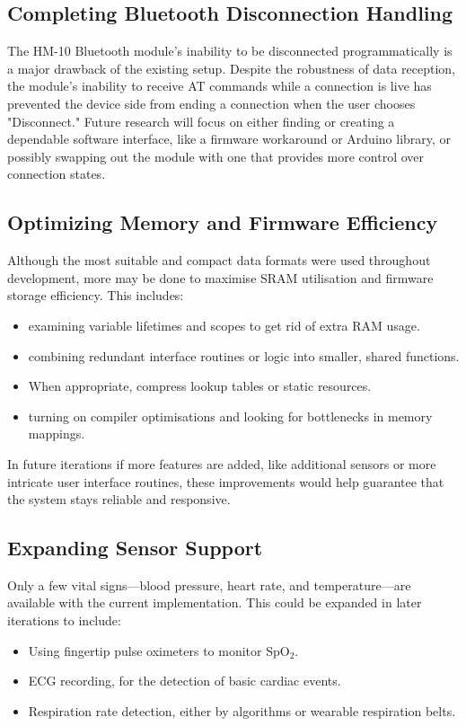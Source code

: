 \subsection{Completing Bluetooth Disconnection Handling}
The HM-10 Bluetooth module's inability to be disconnected programmatically is a major drawback of the existing setup. Despite the robustness of data reception, the module's inability to receive AT commands while a connection is live has prevented the device side from ending a connection when the user chooses "Disconnect." Future research will focus on either finding or creating a dependable software interface, like a firmware workaround or Arduino library, or possibly swapping out the module with one that provides more control over connection states.

\subsection{Optimizing Memory and Firmware Efficiency}
Although the most suitable and compact data formats were used throughout development, more may be done to maximise SRAM utilisation and firmware storage efficiency. This includes:

\begin{itemize}
	\item examining variable lifetimes and scopes to get rid of extra RAM usage.
	\item combining redundant interface routines or logic into smaller, shared functions.
	\item When appropriate, compress lookup tables or static resources.
	\item turning on compiler optimisations and looking for bottlenecks in memory mappings.
\end{itemize}

In future iterations if more features are added, like additional sensors or more intricate user interface routines, these improvements would help guarantee that the system stays reliable and responsive.

\subsection{Expanding Sensor Support}
Only a few vital signs---blood pressure, heart rate, and temperature---are available with the current implementation. This could be expanded in later iterations to include:

\begin{itemize}
	\item Using fingertip pulse oximeters to monitor SpO$_2$.
	\item ECG recording, for the detection of basic cardiac events.
	\item Respiration rate detection, either by algorithms or wearable respiration belts.
\end{itemize}

